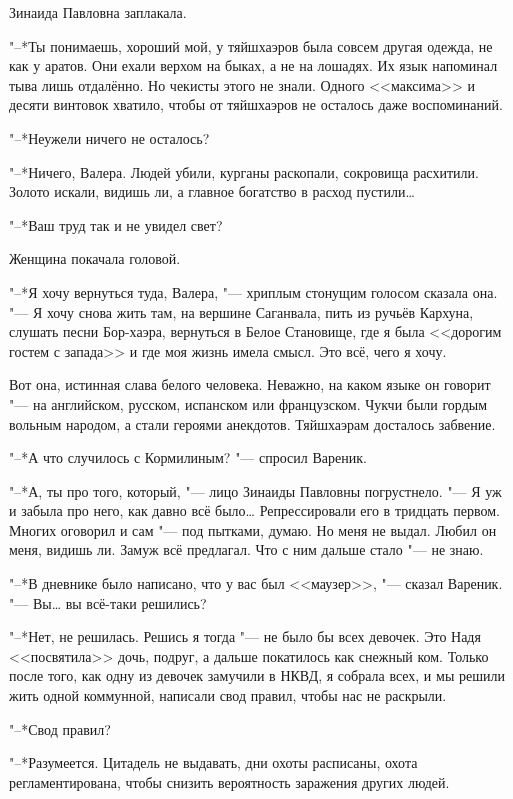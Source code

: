Зинаида Павловна заплакала.

"--*Ты понимаешь, хороший мой, у тяйшхаэров была совсем другая одежда, не как у аратов.
Они ехали верхом на быках, а не на лошадях.
Их язык напоминал тыва лишь отдалённо.
Но чекисты этого не знали.
Одного <<максима>> и десяти винтовок хватило, чтобы от тяйшхаэров не осталось даже воспоминаний.

"--*Неужели ничего не осталось?

"--*Ничего, Валера.
Людей убили, курганы раскопали, сокровища расхитили.
Золото искали, видишь ли, а главное богатство в расход пустили\ldots{}

"--*Ваш труд так и не увидел свет?

Женщина покачала головой.

"--*Я хочу вернуться туда, Валера, "--- хриплым стонущим голосом сказала она.
"--- Я хочу снова жить там, на вершине Саганвала, пить из ручьёв Кархуна, слушать песни Бор-хаэра, вернуться в Белое Становище, где я была <<дорогим гостем с запада>> и где моя жизнь имела смысл.
Это всё, чего я хочу.

Вот она, истинная слава белого человека.
Неважно, на каком языке он говорит "--- на английском, русском, испанском или французском.
Чукчи были гордым вольным народом, а стали героями анекдотов.
Тяйшхаэрам досталось забвение.

\asterism

"--*А что случилось с Кормилиным? "--- спросил Вареник.

"--*А, ты про того, который, "--- лицо Зинаиды Павловны погрустнело.
"--- Я уж и забыла про него, как давно всё было\ldots{}
Репрессировали его в тридцать первом.
Многих оговорил и сам "--- под пытками, думаю.
Но меня не выдал.
Любил он меня, видишь ли.
Замуж всё предлагал.
Что с ним дальше стало "--- не знаю.

"--*В дневнике было написано, что у вас был <<маузер>>, "--- сказал Вареник.
"--- Вы\ldots{} вы всё-таки решились?

"--*Нет, не решилась.
Решись я тогда "--- не было бы всех девочек.
Это Надя <<посвятила>> дочь, подруг, а дальше покатилось как снежный ком.
Только после того, как одну из девочек замучили в НКВД, я собрала всех, и мы решили жить одной коммунной, написали свод правил, чтобы нас не раскрыли.

"--*Свод правил?

"--*Разумеется.
Цитадель не выдавать, дни охоты расписаны, охота регламентирована, чтобы снизить вероятность заражения других людей.

